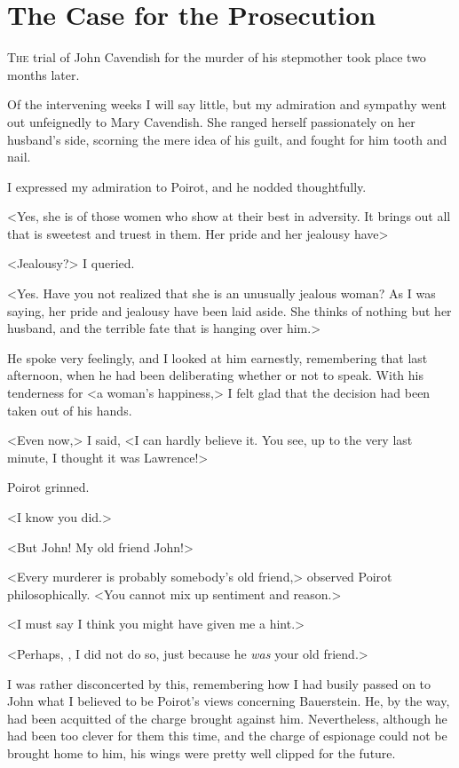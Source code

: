 \chapter{The Case for the Prosecution} 

\lettrine{T}{he} trial of John Cavendish for the murder of his stepmother took place two months later. 

\zz
 Of the intervening weeks I will say little, but my admiration and sympathy went out unfeignedly to Mary Cavendish. She ranged herself passionately on her husband's side, scorning the mere idea of his guilt, and fought for him tooth and nail. 

 I expressed my admiration to Poirot, and he nodded thoughtfully. 

 <Yes, she is of those women who show at their best in adversity. It brings out all that is sweetest and truest in them. Her pride and her jealousy have\longdash> 

 <Jealousy?> I queried. 

 <Yes. Have you not realized that she is an unusually jealous woman? As I was saying, her pride and jealousy have been laid aside. She thinks of nothing but her husband, and the terrible fate that is hanging over him.> 

 He spoke very feelingly, and I looked at him earnestly, remembering that last afternoon, when he had been deliberating whether or not to speak. With his tenderness for <a woman's happiness,> I felt glad that the decision had been taken out of his hands. 

 <Even now,> I said, <I can hardly believe it. You see, up to the very last minute, I thought it was Lawrence!> 

 Poirot grinned. 

 <I know you did.> 

 <But John! My old friend John!> 

 <Every murderer is probably somebody's old friend,> observed Poirot philosophically. <You cannot mix up sentiment and reason.> 

 <I must say I think you might have given me a hint.> 

 <Perhaps, , I did not do so, just because he \emph{was} your old friend.> 

 I was rather disconcerted by this, remembering how I had busily passed on to John what I believed to be Poirot's views concerning Bauerstein. He, by the way, had been acquitted of the charge brought against him. Nevertheless, although he had been too clever for them this time, and the charge of espionage could not be brought home to him, his wings were pretty well clipped for the future. 

